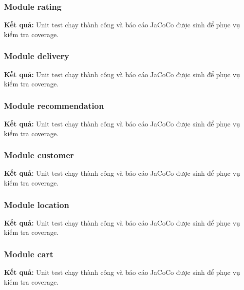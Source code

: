 
\subsubsection{Module rating}
\textbf{Kết quả:} Unit test chạy thành công và báo cáo JaCoCo được sinh để phục vụ kiểm tra coverage.


\subsubsection{Module delivery}
\textbf{Kết quả:} Unit test chạy thành công và báo cáo JaCoCo được sinh để phục vụ kiểm tra coverage.


\subsubsection{Module recommendation}
\textbf{Kết quả:} Unit test chạy thành công và báo cáo JaCoCo được sinh để phục vụ kiểm tra coverage.


\subsubsection{Module customer}
\textbf{Kết quả:} Unit test chạy thành công và báo cáo JaCoCo được sinh để phục vụ kiểm tra coverage.


\subsubsection{Module location}
\textbf{Kết quả:} Unit test chạy thành công và báo cáo JaCoCo được sinh để phục vụ kiểm tra coverage.


\subsubsection{Module cart}
\textbf{Kết quả:} Unit test chạy thành công và báo cáo JaCoCo được sinh để phục vụ kiểm tra coverage.

